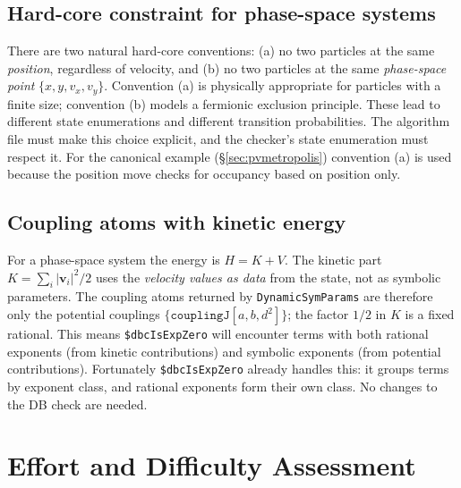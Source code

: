 \documentclass[12pt,a4paper]{article}
\begin{document}
\subsection{Hard-core constraint for phase-space systems}
There are two natural hard-core conventions: (a) no two particles at the same
\emph{position}, regardless of velocity, and (b) no two particles at the same
\emph{phase-space point} $\{x, y, v_x, v_y\}$.  Convention (a) is physically
appropriate for particles with a finite size; convention (b) models a fermionic
exclusion principle.  These lead to different state enumerations and different
transition probabilities.  The algorithm file must make this choice explicit,
and the checker's state enumeration must respect it.  For the canonical example
(\S\ref{sec:pvmetropolis}) convention (a) is used because the position move
checks for occupancy based on position only.

\subsection{Coupling atoms with kinetic energy}
For a phase-space system the energy is $H = K + V$.  The kinetic part $K =
\sum_i |\mathbf{v}_i|^2/2$ uses the \emph{velocity values as data} from the
state, not as symbolic parameters.  The coupling atoms returned by
\texttt{DynamicSymParams} are therefore only the potential couplings
$\{\texttt{couplingJ}[a, b, d^2]\}$; the factor $1/2$ in $K$ is a fixed
rational.  This means \texttt{\$dbcIsExpZero} will encounter terms with both
rational exponents (from kinetic contributions) and symbolic exponents (from
potential contributions).  Fortunately \texttt{\$dbcIsExpZero} already handles
this: it groups terms by exponent class, and rational exponents form their own
class.  No changes to the DB check are needed.

\section{Effort and Difficulty Assessment}
\label{sec:effort}
\end{document}

